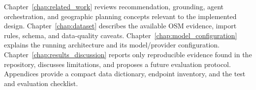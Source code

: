 Chapter~\ref{chap:related_work} reviews recommendation, grounding, agent orchestration, and geographic planning concepts relevant to the implemented design. Chapter~\ref{chap:dataset} describes the available OSM evidence, import rules, schema, and data-quality caveats. Chapter~\ref{chap:model_configuration} explains the running architecture and its model/provider configuration. Chapter~\ref{chap:results_discussion} reports only reproducible evidence found in the repository, discusses limitations, and proposes a future evaluation protocol. Appendices provide a compact data dictionary, endpoint inventory, and the test and evaluation checklist.
